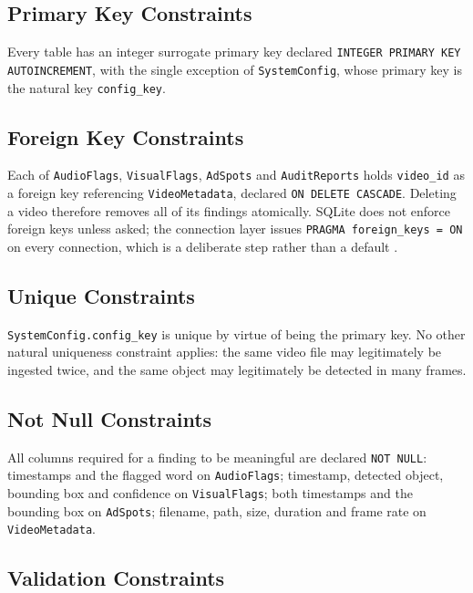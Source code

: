 \documentclass[
12pt,
a4paper,
oneside
]{report}
\begin{document}
\subsection{Primary Key Constraints}

Every table has an integer surrogate primary key declared \texttt{INTEGER
PRIMARY KEY AUTOINCREMENT}, with the single exception of \texttt{SystemConfig},
whose primary key is the natural key \texttt{config\_key}.

\subsection{Foreign Key Constraints}

Each of \texttt{AudioFlags}, \texttt{VisualFlags}, \texttt{AdSpots} and
\texttt{AuditReports} holds \texttt{video\_id} as a foreign key referencing
\texttt{VideoMetadata}, declared \texttt{ON DELETE CASCADE}. Deleting a video
therefore removes all of its findings atomically. SQLite does not enforce
foreign keys unless asked; the connection layer issues \texttt{PRAGMA
foreign\_keys = ON} on every connection, which is a deliberate step rather than
a default \cite{Elmasri2017}.

\subsection{Unique Constraints}

\texttt{SystemConfig.config\_key} is unique by virtue of being the primary key.
No other natural uniqueness constraint applies: the same video file may
legitimately be ingested twice, and the same object may legitimately be detected
in many frames.

\subsection{Not Null Constraints}

All columns required for a finding to be meaningful are declared
\texttt{NOT NULL}: timestamps and the flagged word on \texttt{AudioFlags};
timestamp, detected object, bounding box and confidence on \texttt{VisualFlags};
both timestamps and the bounding box on \texttt{AdSpots}; filename, path, size,
duration and frame rate on \texttt{VideoMetadata}.

\subsection{Validation Constraints}
\end{document}
